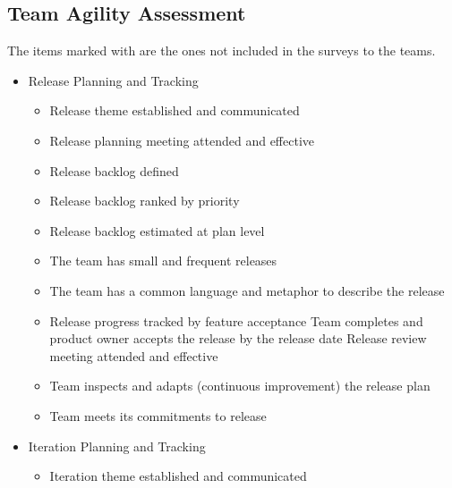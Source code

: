 \begin{appendices}
\chapter{Team Agility Assessment}
\label{sec:team_agility_assessment} %

The items marked with \XSolidBrush  are the ones not included in the surveys to the teams.

\begin{itemize}
	\removed Product Ownership
		\begin{itemize}
			\removed Backlog prioritized and ranked by business value 
			\removed Backlog estimated at gross level 
			\removed Product owner defines acceptance criteria for stories 
			\removed Product owner and stakeholders participate at iteration and release planning 
			\removed Product owner and stakeholders participate at iteration and release review 
			\removed Product owner collaboration with team is continuous 
			\removed Stories sufficiently elaborated prior to planning meetings
		\end{itemize}
	\item Release Planning and Tracking
		\begin{itemize}
			\item Release theme established and communicated 
			\item Release planning meeting attended and effective 
			\item Release backlog defined 
			\item Release backlog ranked by priority 
			\item Release backlog estimated at plan level 
			\item The team has small and frequent releases
			\item The team has a common language and metaphor to describe the release
			\item Release progress tracked by feature acceptance
			\removed Team completes and product owner accepts the release by the release date
			\removed Release review meeting attended and effective
			\item Team inspects and adapts (continuous improvement) the release plan
			\item Team meets its commitments to release
		\end{itemize}
	\item Iteration Planning and Tracking
		\begin{itemize}
			\item Iteration theme established and communicated

\end{itemize}
\end{itemize}
\end{appendices}
